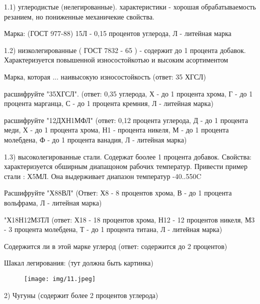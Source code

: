 {\begin{center}
    \par 1.1) углеродистые (нелегированные). характеристики - хорошая обрабатываемость резанием, но пониженные механичекие свойства. 

    \par Марка: (ГОСТ 977-88)   15Л - 0,15 процентов углерода, Л - литейная марка

    \par 1.2) низколегированные ( ГОСТ 7832 - 65 ) - содержит до 1 процента добавок. Характеризуется повышенной износостойкотью и высоким асортиментом 

    \par Марка, которая ... наивысокую износостойкость (ответ: 35 ХГСЛ)

    \par расшифруйте "35ХГСЛ".    (ответ: 0,35 углерода, Х - до 1 процента хрома, Г - до 1 процента марганца, С - до 1 процента кремния, Л - литейная марка)  

    \par расшифруйте "12ДХН1МФЛ" (ответ: 0,12 процента углерода, Д - до 1 процента меди, Х - до 1 процента хрома, Н1 -  процента никеля, М - до 1 процента молебдена, Ф - до 1 процента ванадия, Л - литейная марка) 
    
    \par 1.3) высоколегированные стали. Содержат боолее 1 процента добавок. Свойства: характеризуется обширным диапащоном рабочих температур. Привести пример стали : Х5МЛ. Она выдерживает диапазон температур -40..550C 

    \par Расшифруйте "Х88ВЛ" (Ответ: Х8 - 8 процентов хрома, В - до 1 процента вольфрама, Л - литейная марка)

    \par "Х18Н12М3ТЛ (ответ: Х18 - 18 процентов хрома, Н12 - 12 процентов никеля, М3 - 3 процента молебдена, Т - до 1 процента титана, Л - литейная марка)

    \par Содержится ли в этой марке углерод (ответ: содержится до 2 процентов)

   \par Шакал легирования: (тут должна быть картинка)
 
    \begin{figure}[H]
    \centering\texttt{[image: img/11.jpeg]} 
    \end{figure}

    \par 2) Чугуны (содержит более 2 процентов углерода)


\end{center}}
